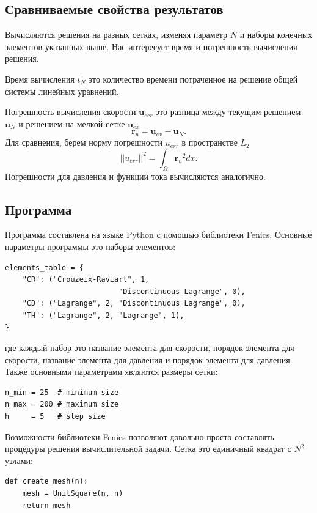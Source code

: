 \documentclass[12pt]{article}
\begin{document}
\subsection{Сравниваемые свойства результатов}
Вычисляются решения на разных сетках, изменяя параметр $N$ и наборы конечных элементов указанных выше.
Нас интересует время и погрешность вычисления решения.

Время вычисления $t_N$ это количество времени потраченное на решение общей системы линейных уравнений.

Погрешность вычисления скорости $\bm u_{err}$ это разница между текущим решением $\bm u_N$ и решением на мелкой сетке $\bm u_{ex}$
\begin{equation}
{\bm r_{u}} = {\bm u_{ex}} - {\bm u_N}.
\end{equation}
Для сравнения, берем норму погрешности $u_{err}$ в пространстве $L_2$
\begin{equation}
||u_{err}||^2 = \int_{\Omega} {\bm r_{u}}^2 dx.
\end{equation}
Погрешности для давления и функции тока вычисляются аналогично.

\subsection{Программа}
Программа составлена на языке Python с помощью библиотеки Fenics.
Основные параметры программы это наборы элементов:
\begin{lstlisting}
elements_table = {
    "CR": ("Crouzeix-Raviart", 1, 
                          "Discontinuous Lagrange", 0),
    "CD": ("Lagrange", 2, "Discontinuous Lagrange", 0),    
    "TH": ("Lagrange", 2, "Lagrange", 1),
}
\end{lstlisting}
где каждый набор это название элемента для скорости, порядок элемента для скорости, название элемента для давления и порядок элемента для давления. Также основными параметрами являются размеры сетки:
\begin{lstlisting}
n_min = 25  # minimum size
n_max = 200 # maximum size
h     = 5   # step size
\end{lstlisting}

Возможности библиотеки Fenics позволяют довольно просто составлять процедуры решения вычислительной задачи. Сетка это единичный квадрат с $N^2$ узлами:
\begin{lstlisting}
def create_mesh(n):
    mesh = UnitSquare(n, n)
    return mesh
\end{lstlisting}
\end{document}
